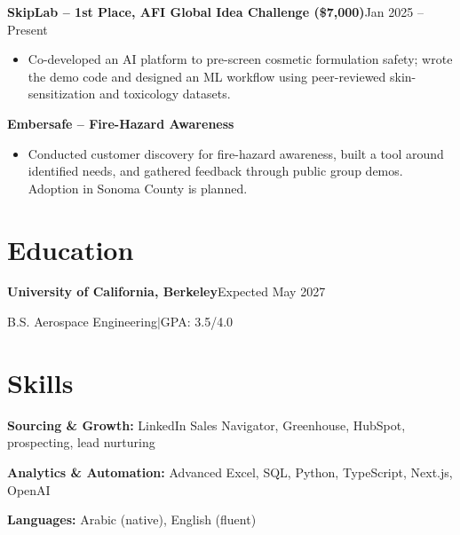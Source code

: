 \documentclass[a4paper,10pt]{article}
\newcommand{\project}[2]{\textbf{#1}\hfill #2\par}
\begin{document}
\project
{SkipLab -- 1st Place, AFI Global Idea Challenge (\$7,000)}
{Jan 2025 -- Present}
\begin{itemize}
  \item Co-developed an AI platform to pre-screen cosmetic formulation
  safety; wrote the demo code and designed an ML workflow using
  peer-reviewed skin-sensitization and toxicology datasets.
\end{itemize}

\project{Embersafe -- Fire-Hazard Awareness}{}
\begin{itemize}
  \item Conducted customer discovery for fire-hazard awareness,
  built a tool around identified needs, and gathered feedback
  through public group demos. Adoption in Sonoma County is planned.
\end{itemize}

\section{Education}
\textbf{University of California, Berkeley}\hfill Expected May 2027\par
B.S. Aerospace Engineering\enspace$|$\enspace GPA: 3.5/4.0\par

\section{Skills}
\textbf{Sourcing \& Growth:} LinkedIn Sales Navigator, Greenhouse, HubSpot,
prospecting, lead nurturing\par
\textbf{Analytics \& Automation:} Advanced Excel, SQL, Python, TypeScript,
Next.js, OpenAI\par
\textbf{Languages:} Arabic (native), English (fluent)
\end{document}
